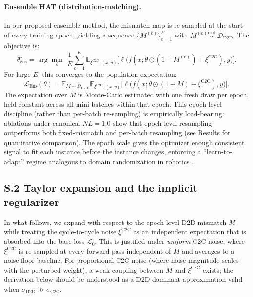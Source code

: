 \paragraph{Ensemble HAT (distribution-matching).} In our proposed ensemble method, the mismatch map is re-sampled at the start of every training epoch, yielding a sequence $\{M^{(e)}\}_{e=1}^{E}$ with $M^{(e)} \stackrel{\text{i.i.d.}}{\sim} \mathcal{D}_{\text{D2D}}$. The objective is:
\begin{equation}
    \theta_{\text{ens}}^{\star} = \arg\min_{\theta} \; \frac{1}{E}\sum_{e=1}^{E} \mathbb{E}_{\xi^{\text{C2C}}, (x,y)} \bigl[ \ell\bigl(f(x; \theta \odot (1+M^{(e)}) + \xi^{\text{C2C}}), y\bigr) \bigr].
    \label{eq:ensemble-hat-objective}
\end{equation}
For large $E$, this converges to the population expectation:
\begin{equation}
    \mathcal{L}_{\text{Ens}}(\theta) = \mathbb{E}_{M \sim \mathcal{D}_{\text{D2D}}} \, \mathbb{E}_{\xi^{\text{C2C}}, (x,y)} \bigl[ \ell\bigl(f(x; \theta \odot (1+M) + \xi^{\text{C2C}}), y\bigr) \bigr].
    \label{eq:ensemble-population}
\end{equation}
The expectation over $M$ is Monte-Carlo estimated with one fresh draw per epoch, held constant across all mini-batches within that epoch. This epoch-level discipline (rather than per-batch re-sampling) is empirically load-bearing: ablations under canonical $NL=1.0$ show that epoch-level resampling outperforms both fixed-mismatch and per-batch resampling (see Results for quantitative comparison). The epoch scale gives the optimizer enough consistent signal to fit each instance before the instance changes, enforcing a ``learn-to-adapt'' regime analogous to domain randomization in robotics \citep{tobin2017domain}.

\subsection*{S.2 Taylor expansion and the implicit regularizer}

In what follows, we expand with respect to the epoch-level D2D mismatch $M$ while treating the cycle-to-cycle noise $\xi^{\text{C2C}}$ as an independent expectation that is absorbed into the base loss $\mathcal{L}_0$. This is justified under \emph{uniform} C2C noise, where $\xi^{\text{C2C}}$ is re-sampled at every forward pass independent of $M$ and averages to a noise-floor baseline. For proportional C2C noise (where noise magnitude scales with the perturbed weight), a weak coupling between $M$ and $\xi^{\text{C2C}}$ exists; the derivation below should be understood as a D2D-dominant approximation valid when $\sigma_{\text{D2D}} \gg \sigma_{\text{C2C}}$.

